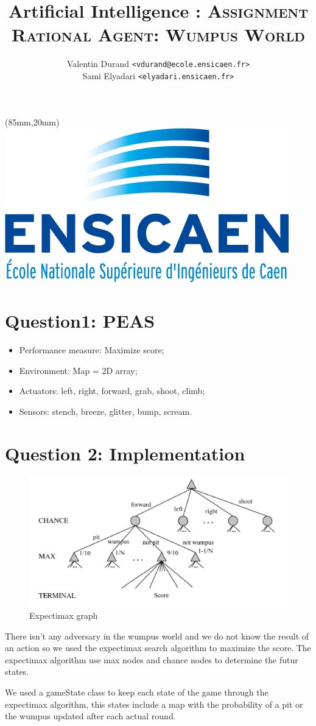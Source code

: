 \documentclass[a4paper,11pt,final]{article}
\title{Artificial Intelligence : \textsc{Assignment \\ Rational Agent: Wumpus World}}
\author{Valentin Durand \texttt{<vdurand@ecole.ensicaen.fr>}\\Sami Elyadari \texttt{<elyadari.ensicaen.fr>}}
\begin{document}
\begin{textblock*}{3cm}(85mm,20mm) 
	\includegraphics[scale=0.2]{./pic/logo-ensicaen-2015.jpg} 
\end{textblock*} 

\maketitle

\section*{Question1: PEAS}
\begin{itemize}
\item Performance measure: Maximize score;
\item Environment: Map = 2D array;
\item Actuators: left, right, forward, grab, shoot, climb;
\item Sensors: stench, breeze, glitter, bump, scream.
\end{itemize}

\section*{Question 2: Implementation}

\begin{figure}[!ht]
    \centering
    \includegraphics[width=120mm]{./pic/diagram.jpg}
    \caption{Expectimax graph}
\end{figure}

There isn't any adversary in the wumpus world and we do not know the result of an action so we used the expectimax search algorithm to maximize the score.
The expectimax algorithm use max nodes and chance nodes to determine the futur states.

We used a gameState class to keep each state of the game through the expectimax algorithm, this states include a map with the probability of a pit or the wumpus updated after each actual round.
\end{document}
